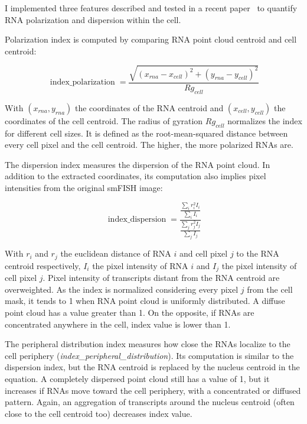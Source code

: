 I implemented three features described and tested in a recent paper~\cite{stueland_rdi_2019} to quantify \ac{RNA} polarization and dispersion within the cell.

Polarization index is computed by comparing \ac{RNA} point cloud centroid and cell centroid:

\begin{equation}
	{\displaystyle \operatorname{index\_polarization} = \frac{\sqrt{(x_{rna} - x_{cell})^2 + (y_{rna} - y_{cell})^2}}{Rg_{cell}}}
\end{equation}

\noindent
With $(x_{rna}, y_{rna})$ the coordinates of the \ac{RNA} centroid and $(x_{cell}, y_{cell})$ the coordinates of the cell centroid.
The radius of gyration $Rg_{cell}$ normalizes the index for different cell sizes.
It is defined as the root-mean-squared distance between every cell pixel and the cell centroid.
The higher, the more polarized \ac{RNA}s are.

The dispersion index measures the dispersion of the \ac{RNA} point cloud.
In addition to the extracted coordinates, its computation also implies pixel intensities from the original \ac{smFISH} image:

\begin{equation}
	{\displaystyle \operatorname{index\_dispersion} = \frac{\frac{\sum_{i} r_i^2 I_i}{\sum_{i} I_i}}{\frac{\sum_{j} r_j^2 I_j}{\sum_{j} I_j}}}
\end{equation}

\noindent
With $r_i$ and $r_j$ the euclidean distance of \ac{RNA} $i$ and cell pixel $j$ to the \ac{RNA} centroid respectively, $I_i$ the pixel intensity of \ac{RNA} $i$ and $I_j$ the pixel intensity of cell pixel $j$.
Pixel intensity of transcripts distant from the \ac{RNA} centroid are overweighted.
As the index is normalized considering every pixel $j$ from the cell mask, it tends to 1 when \ac{RNA} point cloud is uniformly distributed.
A diffuse point cloud has a value greater than 1.
On the opposite, if \ac{RNA}s are concentrated anywhere in the cell, index value is lower than 1.

The peripheral distribution index measures how close the \ac{RNA}s localize to the cell periphery (\emph{index\_peripheral\_distribution}).
Its computation is similar to the dispersion index, but the \ac{RNA} centroid is replaced by the nucleus centroid in the equation.
A completely dispersed point cloud still has a value of 1, but it increases if \ac{RNA}s move toward the cell periphery, with a concentrated or diffused pattern.
Again, an aggregation of transcripts around the nucleus centroid (often close to the cell centroid too) decreases index value.

